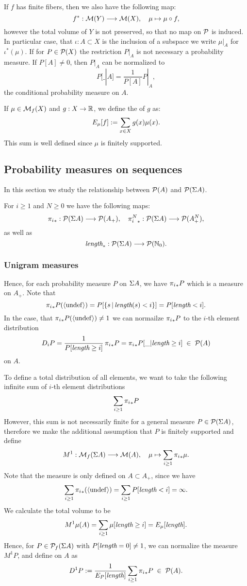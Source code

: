 \documentclass[11pt]{article}
\begin{document}
If $f$ has finite fibers, then we also have the following map:
\[ f^*: \mathcal{M}(Y) \longrightarrow \mathcal{M}(X), \quad \mu \mapsto \mu \circ f, \]
however the total volume of $Y$ is not preserved, so that no map on
$\mathcal{P}$ is induced. In particular case, that $\iota: A \subset X$ is
the inclusion of a subspace we write $\mu|_A$ for $\iota^*(\mu)$.  If
for $P\in \mathcal{P}(X)$ the restriction $P|_{A}$ is not necessary a
probability measure. If $P[A] \neq 0$, then $P|_A$ can be normalized
to \[ P[\_|A]=\frac{1}{P[A]}P|_A,\] the conditional probability
measure on $A$.

If $\mu \in \mathcal{M}_f(X)$ and $g:X \rightarrow {\mathbb R}$, we define the 
of $g$ as:
\[ E_{\mu}[f] :=  \sum_{x \in X} g(x) \mu(x). \]
This sum is well defined since $\mu$ is  finitely supported.

\subsection{Probability measures on sequences}


In this section we study the relationship between $\mathcal{P}(A)$ and
$\mathcal{P}(\Sigma A)$.

For $i \geq 1$ and $N \geq 0$ we have the following maps:
\[ {\pi_{i}}_*: \mathcal{P}(\Sigma A) \longrightarrow \mathcal{P}(A_+), \quad {\pi_{i}^{N}}_*: \mathcal{P}(\Sigma A) \longrightarrow \mathcal{P}(A^N_+), \]
as well as
\[ \text{\it length}_*: \mathcal{P}(\Sigma A) \longrightarrow \mathcal{P}({\mathbb N}_0). \]

\subsubsection{Unigram measures}

Hence, for each probability measure $P$ on $\Sigma A$, we have
${\pi_{i}}_* P$ which is a measure on $A_+$. Note that
\[ {\pi_{i}}_* P (\langle \mathrm{undef} \rangle) = P[\{s \,|\, \text{\it length}(s) < i \}] = P[\text{\it length} < i]. \]
In the case, that ${\pi_{i}}_* P (\langle \mathrm{undef} \rangle) \neq 1$ we can normailze
${\pi_{i}}_* P$ to the $i$-th element distribution
\[ D_i P = \frac{1}{P[\text{\it length} \geq i]} \, {\pi_{i}}_* P = {\pi_{i}}_*P[\_|\text{\it length}
\geq i]  \;\in\; \mathcal{P}(A)\]
on $A$.

To define a total distribution of all elements, we want to take the
following infinite sum of $i$-th element distributions
\[ \sum_{i \geq 1} {\pi_{i}}_* P \]
However, this sum is not necessarily finite for a general measure $P
\in \mathcal{P}(\Sigma A)$, therefore we make the additional assumption that $P$
is finitely supported and define
\[ M^1 : \mathcal{M}_f(\Sigma A) \longrightarrow \mathcal{M}(A), \quad \mu \mapsto 
         \sum_{i \geq 1} {\pi_{i}}_* \mu. \]
Note that the measure is only defined on $A \subset A_+$, since
we have
\[ \sum_{i \geq 1} {\pi_{i}}_*(\langle \mathrm{undef} \rangle) = \sum_{i \geq 1} P[\text{\it length} < i] =
\infty. \]
We calculate the total volume to be
\[ M^1 \mu(A) = \sum_{i \geq 1} \mu[\text{\it length} \geq i] = E_{\mu}[\text{\it length}]. \]
Hence, for $P \in \mathcal{P}_f(\Sigma A)$ with $P[\text{\it length} = 0] \neq 1$, we can
normalize the measure $M^1P$, and define  on
$A$ as
\[ D^1 P := \frac{1}{E_{P}[\text{\it length}]} \sum_{i \geq 1} {\pi_{i}}_* P \;\in\;
\mathcal{P}(A). \]
\end{document}
